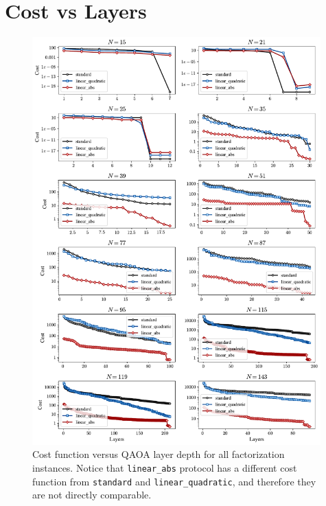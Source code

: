\newpage
\section{Cost vs Layers}
\label{Section:CostPlots}

\begin{figure}[H]
    \centering
    \includegraphics[width=0.99\textwidth]{06-appendix/figs/cost_layers_all.pdf}
    \caption{Cost function versus QAOA layer depth for all factorization instances.
    Notice that \texttt{linear\_abs} protocol has a different cost function from
    \texttt{standard} and \texttt{linear\_quadratic}, and therefore they are not
    directly comparable.}
    \label{fig:cost_layers_all}
\end{figure}
